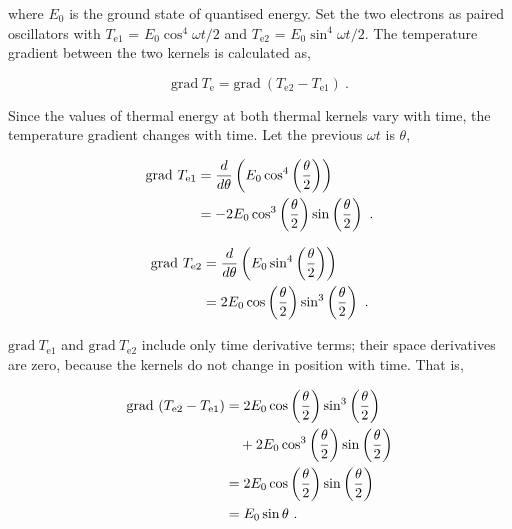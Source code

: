 \documentclass[10.5pt]{article}
\numberwithin{equation}{section}
\begin{document}
    \noindent where $E_{0}$ is the ground state of quantised energy. Set the two electrons as paired oscillators with $T_{\mathrm{e1}}$ = $E_{0} \cos^{4} \omega t /2$ and $T_{\mathrm{e2}}$ = $E_{0} \sin^{4} \omega t /2$. The temperature gradient between the two kernels is calculated as,

    \begin{equation}
            \mathrm{grad} \ T_{\mathrm{e}} = \mathrm{grad} \ ( T_{\mathrm{e2}} - T_{\mathrm{e1}} )
            \ .
            \label{e3_k_grad_Te2-Te1}
    \end{equation}

    Since the values of thermal energy at both thermal kernels vary with time, the temperature gradient changes with time. Let the previous $\omega t$ is $\theta$,

        \begin{align}
            \mathrm{grad} \ T_{\mathrm{e1}}
                &= \frac{d}{d \theta} \left( E_{0} \cos^{4} \left( \frac{\theta}{2} \right) \right) \notag \\
                &= - 2 E_{0} \cos^{3} \left( \frac{\theta}{2} \right) \sin \left( \frac{\theta}{2} \right)
                \ .
                \label{e3_gradT_e1}
        \end{align}

        \begin{align}
            \mathrm{grad} \ T_{\mathrm{e2}}
                &= \frac{d}{d \theta} \left( E_{0} \sin^{4} \left( \frac{\theta}{2} \right) \right) \notag \\
                &=   2 E_{0} \cos \left( \frac{\theta}{2} \right) \sin^{3} \left( \frac{\theta}{2} \right)
                \ .
                \label{e3_gradT_e2}
        \end{align}        
 

    $\mathrm{grad} \ T_{\mathrm{e1}}$ and $\mathrm{grad} \ T_{\mathrm{e2}}$ include only time derivative terms; their space derivatives are zero, because the kernels do not change in position with time. That is,

        \begin{align}
            \mathrm{grad} \ (T_{\mathrm{e2}} - T_{\mathrm{e1}})
                &= 2 E_{0} \cos \left( \frac{\theta}{2} \right) \sin^{3} \left( \frac{\theta}{2} \right) \notag \\
                & \quad + 2 E_{0} \cos^{3} \left( \frac{\theta}{2} \right) \sin \left( \frac{\theta}{2} \right) \notag \\
                &= 2 E_{0} \cos \left( \frac{\theta}{2} \right) \sin \left( \frac{\theta}{2} \right) \notag \\
                &= E_{0} \sin \theta
                \ .
            \label{e3_simple_harmonic_motion}
        \end{align}
\end{document}
